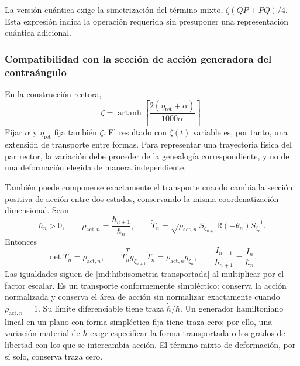 La versión cuántica exige la simetrización del término mixto,
$\dot\zeta(QP+PQ)/4$. Esta expresión indica la operación requerida sin
presuponer una representación cuántica adicional.

\subsubsection{Compatibilidad con la sección de acción generadora del contraángulo}
\label{md:hib:compatibilidad-accion}

En la construcción rectora,
\begin{equation}
 \zeta=\operatorname{artanh}
 \left[\frac{2(\eta_{\mathrm{ret}}+\alpha)}{1000\alpha}\right].
 \label{md:hib:forma-genealogica}
\end{equation}
Fijar $\alpha$ y $\eta_{\mathrm{ret}}$ fija también $\zeta$.
El resultado con $\zeta(t)$ variable es, por tanto, una extensión de
transporte entre formas. Para representar una trayectoria física del par
rector, la variación debe proceder de la genealogía correspondiente, y no
de una deformación elegida de manera independiente.

También puede componerse exactamente el transporte cuando cambia la
sección positiva de acción entre dos estados, conservando la misma coordenatización
dimensional. Sean
\begin{equation}
 \hbar_n>0,\qquad
 \rho_{\mathrm{act},n}=\frac{\hbar_{n+1}}{\hbar_n},\qquad
 \widetilde T_n=\sqrt{\rho_{\mathrm{act},n}}\,
 S_{\zeta_{n+1}}\mathsf R(-\theta_n)S_{\zeta_n}^{-1}.
 \label{md:hib:transporte-conforme}
\end{equation}
Entonces
\begin{equation}
 \det\widetilde T_n=\rho_{\mathrm{act},n},\qquad
 \widetilde T_n^Tg_{\zeta_{n+1}}\widetilde T_n
 =\rho_{\mathrm{act},n}g_{\zeta_n},\qquad
 \frac{I_{n+1}}{\hbar_{n+1}}=\frac{I_n}{\hbar_n}.
 \label{md:hib:accion-normalizada}
\end{equation}
Las igualdades siguen de \eqref{md:hib:isometria-transportada} al multiplicar
por el factor escalar. Es un transporte conformemente simpléctico: conserva
la acción normalizada y conserva el área de acción sin normalizar
exactamente cuando $\rho_{\mathrm{act},n}=1$.
Su límite diferenciable tiene traza $\dot\hbar/\hbar$. Un generador
hamiltoniano lineal en un plano con forma simpléctica fija tiene traza cero;
por ello, una variación material de $\hbar$ exige especificar la forma
transportada o los grados de libertad con los que se intercambia acción.
El término mixto de deformación, por sí solo, conserva traza cero.


